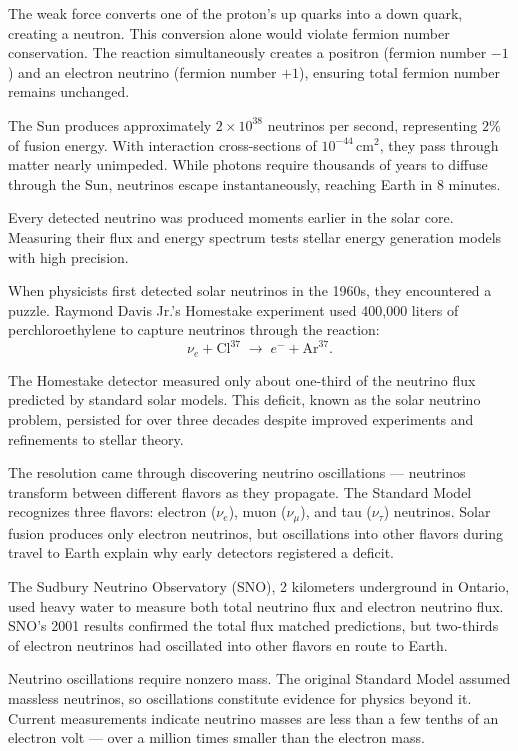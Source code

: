 The weak force converts one of the proton's up quarks into a down quark, creating a neutron. This conversion alone would violate fermion number conservation. The reaction simultaneously creates a positron (fermion number $-1$) and an electron neutrino (fermion number $+1$), ensuring total fermion number remains unchanged.

The Sun produces approximately $2 \times 10^{38}$ neutrinos per second, representing $2\%$ of fusion energy. With interaction cross-sections of $10^{-44}\,\text{cm}^2$, they pass through matter nearly unimpeded. While photons require thousands of years to diffuse through the Sun, neutrinos escape instantaneously, reaching Earth in 8 minutes.

Every detected neutrino was produced moments earlier in the solar core. Measuring their flux and energy spectrum tests stellar energy generation models with high precision.

When physicists first detected solar neutrinos in the 1960s, they encountered a puzzle. Raymond Davis Jr.'s Homestake experiment used 400,000 liters of perchloroethylene to capture neutrinos through the reaction:
\[
\nu_e + \text{Cl}^{37} \;\to\; e^- + \text{Ar}^{37}.
\]

The Homestake detector measured only about one-third of the neutrino flux predicted by standard solar models. This deficit, known as the solar neutrino problem, persisted for over three decades despite improved experiments and refinements to stellar theory.

The resolution came through discovering neutrino oscillations — neutrinos transform between different flavors as they propagate. The Standard Model recognizes three flavors: electron ($\nu_e$), muon ($\nu_\mu$), and tau ($\nu_\tau$) neutrinos. Solar fusion produces only electron neutrinos, but oscillations into other flavors during travel to Earth explain why early detectors registered a deficit.

The Sudbury Neutrino Observatory (SNO), 2 kilometers underground in Ontario, used heavy water to measure both total neutrino flux and electron neutrino flux. SNO's 2001 results confirmed the total flux matched predictions, but two-thirds of electron neutrinos had oscillated into other flavors en route to Earth.

Neutrino oscillations require nonzero mass. The original Standard Model assumed massless neutrinos, so oscillations constitute evidence for physics beyond it. Current measurements indicate neutrino masses are less than a few tenths of an electron volt — over a million times smaller than the electron mass.

